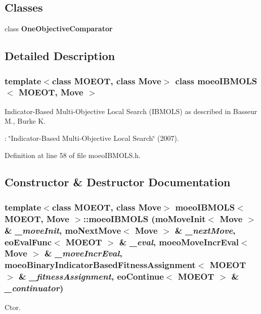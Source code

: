 \subsection*{Classes}
\begin{CompactItemize}
\item 
class \bf{One\-Objective\-Comparator}
\end{CompactItemize}


\subsection{Detailed Description}
\subsubsection*{template$<$class MOEOT, class Move$>$ class moeo\-IBMOLS$<$ MOEOT, Move $>$}

Indicator-Based Multi-Objective Local Search (IBMOLS) as described in Basseur M., Burke K. 

: \char`\"{}Indicator-Based Multi-Objective Local Search\char`\"{} (2007). 



Definition at line 58 of file moeo\-IBMOLS.h.

\subsection{Constructor \& Destructor Documentation}
\subsubsection{\setlength{\rightskip}{0pt plus 5cm}template$<$class MOEOT, class Move$>$ \bf{moeo\-IBMOLS}$<$ MOEOT, Move $>$::\bf{moeo\-IBMOLS} (mo\-Move\-Init$<$ Move $>$ \& {\em \_\-move\-Init}, mo\-Next\-Move$<$ Move $>$ \& {\em \_\-next\-Move}, eo\-Eval\-Func$<$ MOEOT $>$ \& {\em \_\-eval}, \bf{moeo\-Move\-Incr\-Eval}$<$ Move $>$ \& {\em \_\-move\-Incr\-Eval}, \bf{moeo\-Binary\-Indicator\-Based\-Fitness\-Assignment}$<$ MOEOT $>$ \& {\em \_\-fitness\-Assignment}, eo\-Continue$<$ MOEOT $>$ \& {\em \_\-continuator})\hspace{0.3cm}{\tt  [inline]}}\label{classmoeoIBMOLS_6d6a39ad3d5e4c298d450d801098e274}


Ctor. 

